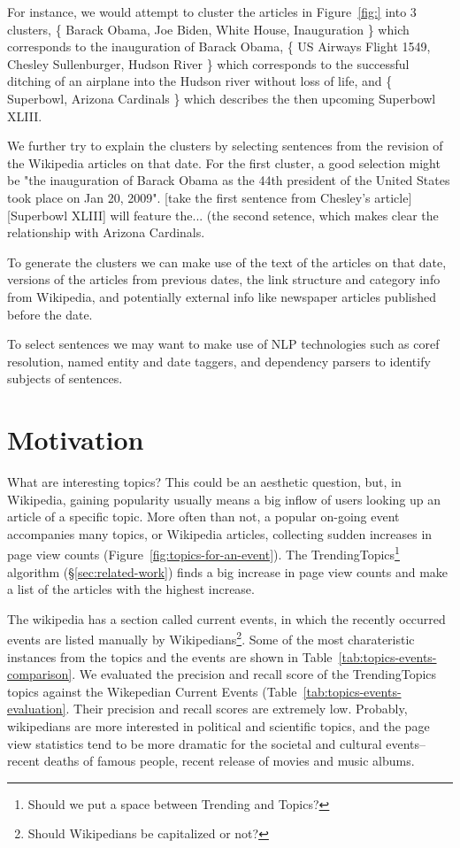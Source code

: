 \documentclass[11pt]{article}
\begin{document}
For instance, we would attempt to cluster the articles in Figure~\ref{fig:} into 3 clusters, \{ Barack Obama, Joe Biden, White House, Inauguration \} which corresponds to the inauguration of Barack Obama, \{ US Airways Flight 1549, Chesley Sullenburger, Hudson River \} which corresponds to the successful ditching of an airplane into the Hudson river without loss of life, and \{ Superbowl, Arizona Cardinals \} which describes the then upcoming Superbowl XLIII.

We further try to explain the clusters by selecting sentences from the revision of the Wikipedia articles on that date. For the first cluster, a good selection might be "the inauguration of Barack Obama as the 44th president of the United States took place on Jan 20, 2009". [take the first sentence from Chesley's article] [Superbowl XLIII] will feature the... (the second setence, which makes clear the relationship with Arizona Cardinals.

To generate the clusters we can make use of the text of the articles on that date, versions of the articles from previous dates, the link structure and category info from Wikipedia, and potentially external info like newspaper articles published before the date.

To select sentences we may want to make use of NLP technologies such as coref resolution, named entity and date taggers, and dependency parsers to identify subjects of sentences.

\section{Motivation}

What are interesting topics? This could be an aesthetic question, but, in Wikipedia, gaining popularity usually means a big inflow of users looking up an article of a specific topic. More often than not, a popular on-going event accompanies many topics, or Wikipedia articles, collecting sudden increases in page view counts (Figure~\ref{fig:topics-for-an-event}). The TrendingTopics\footnote{Should we put a space between Trending and Topics?} algorithm (\S\ref{sec:related-work}) finds a big increase in page view counts and make a list of the articles with the highest increase. 

The wikipedia has a section called current events, in which the recently occurred events are listed manually by Wikipedians\footnote{Should Wikipedians be capitalized or not?}. Some of the most charateristic instances from the topics and the events are shown in Table~\ref{tab:topics-events-comparison}. We evaluated the precision and recall score of the TrendingTopics topics against the Wikepedian Current Events (Table~\ref{tab:topics-events-evaluation}. Their precision and recall scores are extremely low. Probably, wikipedians are more interested in political and scientific topics, and the page view statistics tend to be more dramatic for the societal and cultural events--recent deaths of famous people, recent release of movies and music albums.
\end{document}
